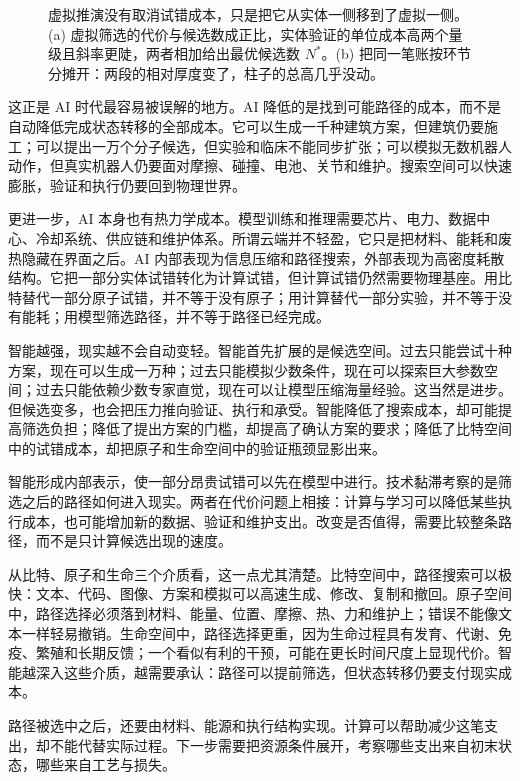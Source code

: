\begin{figure}[ht]


\caption{虚拟推演没有取消试错成本，只是把它从实体一侧移到了虚拟一侧。(a) 虚拟筛选的代价与候选数成正比，实体验证的单位成本高两个量级且斜率更陡，两者相加给出最优候选数 $N^*$。(b) 把同一笔账按环节分摊开：两段的相对厚度变了，柱子的总高几乎没动。}
\label{fig:virtual-trial}
\end{figure}



这正是 AI 时代最容易被误解的地方。AI 降低的是找到可能路径的成本，而不是自动降低完成状态转移的全部成本。它可以生成一千种建筑方案，但建筑仍要施工；可以提出一万个分子候选，但实验和临床不能同步扩张；可以模拟无数机器人动作，但真实机器人仍要面对摩擦、碰撞、电池、关节和维护。搜索空间可以快速膨胀，验证和执行仍要回到物理世界。

更进一步，AI 本身也有热力学成本。模型训练和推理需要芯片、电力、数据中心、冷却系统、供应链和维护体系。所谓云端并不轻盈，它只是把材料、能耗和废热隐藏在界面之后。AI 内部表现为信息压缩和路径搜索，外部表现为高密度耗散结构。它把一部分实体试错转化为计算试错，但计算试错仍然需要物理基座。用比特替代一部分原子试错，并不等于没有原子；用计算替代一部分实验，并不等于没有能耗；用模型筛选路径，并不等于路径已经完成。

智能越强，现实越不会自动变轻。智能首先扩展的是候选空间。过去只能尝试十种方案，现在可以生成一万种；过去只能模拟少数条件，现在可以探索巨大参数空间；过去只能依赖少数专家直觉，现在可以让模型压缩海量经验。这当然是进步。但候选变多，也会把压力推向验证、执行和承受。智能降低了搜索成本，却可能提高筛选负担；降低了提出方案的门槛，却提高了确认方案的要求；降低了比特空间中的试错成本，却把原子和生命空间中的验证瓶颈显影出来。

智能形成内部表示，使一部分昂贵试错可以先在模型中进行。技术黏滞考察的是筛选之后的路径如何进入现实。两者在代价问题上相接：计算与学习可以降低某些执行成本，也可能增加新的数据、验证和维护支出。改变是否值得，需要比较整条路径，而不是只计算候选出现的速度。

从比特、原子和生命三个介质看，这一点尤其清楚。比特空间中，路径搜索可以极快：文本、代码、图像、方案和模拟可以高速生成、修改、复制和撤回。原子空间中，路径选择必须落到材料、能量、位置、摩擦、热、力和维护上；错误不能像文本一样轻易撤销。生命空间中，路径选择更重，因为生命过程具有发育、代谢、免疫、繁殖和长期反馈；一个看似有利的干预，可能在更长时间尺度上显现代价。智能越深入这些介质，越需要承认：路径可以提前筛选，但状态转移仍要支付现实成本。

路径被选中之后，还要由材料、能源和执行结构实现。计算可以帮助减少这笔支出，却不能代替实际过程。下一步需要把资源条件展开，考察哪些支出来自初末状态，哪些来自工艺与损失。
